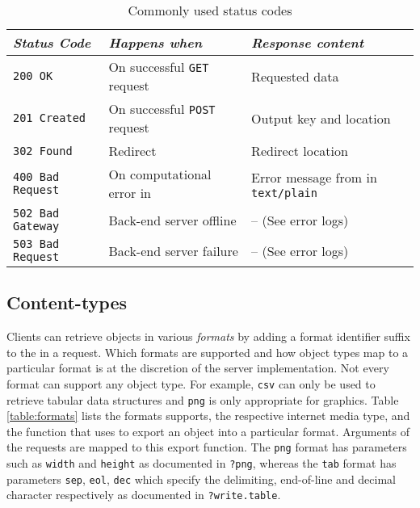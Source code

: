 \begin{sidewaystable}[ht]
\mytablesize
\centering
\begin{tabular}{@{}lll@{}}
\toprule
\emph{Status Code}              & \emph{Happens when}                             & \emph{Response content}                     \\ \midrule
\texttt{200 OK}          & On successful \texttt{GET} request                     & Requested data                    \\
\texttt{201 Created}     & On successful \texttt{POST} request                    & Output key and location                     \\
\texttt{302 Found}       & Redirect                                               & Redirect location                   \\
\texttt{400 Bad Request} & On computational error in \R                                     & Error message from \R in \texttt{text/plain} \\
\texttt{502 Bad Gateway} & Back-end server offline                            & -- (See error logs) \\
\texttt{503 Bad Request} & Back-end server failure                                & -- (See error logs) \\ \bottomrule                          
\end{tabular}
\caption{Commonly used \HTTP status codes}
\label{table:statuscodes}
\end{sidewaystable}

\subsection{Content-types}

Clients can retrieve objects in various \emph{formats} by adding a format identifier suffix to the \URL in a \GET request. Which formats are supported and how object types map to a particular format is at the discretion of the server implementation. Not every format can support any object type. For example, \texttt{csv} can only be used to retrieve tabular data structures and \texttt{png} is only appropriate for graphics. Table \ref{table:formats} lists the formats \OpenCPU supports, the respective internet media type, and the \R function that \OpenCPU uses to export an object into a particular format. Arguments of the \GET requests are mapped to this export function. The \texttt{png} format has parameters such as \texttt{width} and \texttt{height} as documented in \texttt{?png}, whereas the \texttt{tab} format has parameters \texttt{sep}, \texttt{eol}, \texttt{dec} which specify the delimiting, end-of-line and decimal character respectively as documented in \texttt{?write.table}.


